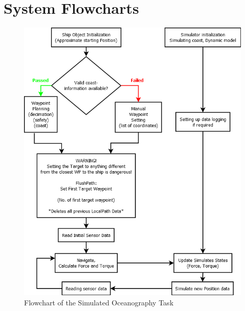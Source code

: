 \appendix
\chapter{System Flowcharts}
\label{chap:schema}

\begin{figure}[htbp]
\centering

\includegraphics[width = \textwidth]{img/HLIFigures/System-Simulation_Interactions.png}
\caption{Flowchart of the Simulated Oceanography Task}
\label{fig:SimFlowchart}
\end{figure}


